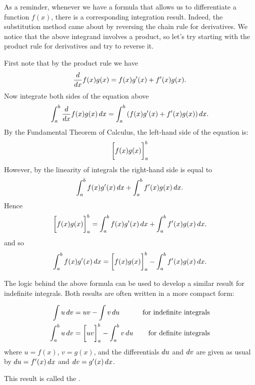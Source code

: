 \documentclass{ximera}
\begin{document}
As a reminder, whenever we have a formula that allows us to differentiate a function $f(x)$, there is a corresponding integration result.  Indeed, the substitution method came about by reversing the chain rule for derivatives.  We notice that the above integrand involves a product, so let's try starting with the product rule for derivatives and try to reverse it.  


First note that by the product rule we have
\[
\frac{d}{\mathop{}\!d x} f(x)g(x) = f(x)g'(x) + f'(x) g(x).
\]
Now integrate both sides of the equation above
\[
\int_a^b \frac{d}{\mathop{}\!d x} f(x) g(x) \mathop{}\!d x = \int_a^b \left(f(x)g'(x) + f'(x) g(x)\right) \mathop{}\!d x.
\]
By the Fundamental Theorem of Calculus, the left-hand side of the equation is:
\[
\bigg[ f(x)g(x) \bigg]_a^b
\]
However, by the linearity of integrals the right-hand side is equal to 
\[
\int_a^b f(x)g'(x)\mathop{}\!d x + \int_a^b f'(x) g(x) \mathop{}\!d x.
\]
Hence
\[
\bigg[ f(x)g(x) \bigg]_a^b = \int_a^b f(x)g'(x)\mathop{}\!d x + \int_a^b f'(x) g(x) \mathop{}\!d x.
\]
and so 
\[
 \int_a^b f(x)g'(x)\mathop{}\!d x = \bigg[ f(x)g(x) \bigg]_a^b -  \int_a^b f'(x) g(x) \mathop{}\!d x.
\]

\begin{remark}
The logic behind the above formula can be used to develop a similar result for indefinite integrals.  Both results are often written in a more compact form:

\begin{align*}
\int u \mathop{}\!d v &= uv-\int v \mathop{}\!d u  & \textrm{ for indefinite integrals} \\
\int_a^b u \mathop{}\!d v &= \bigg[ uv \bigg]_a^b-\int_a^b v \mathop{}\!d u &  \textrm{ for definite integrals}
\end{align*}
where $u=f(x)$, $v=g(x)$, and the differentials $\mathop{}\!d u$ and $\mathop{}\!d v$ are given as usual by $\mathop{}\!d u=f'(x)\mathop{}\!d x$ and $\mathop{}\!d v=g'(x)\mathop{}\!d x$.  

This result is called the .
\end{remark}
\end{document}
